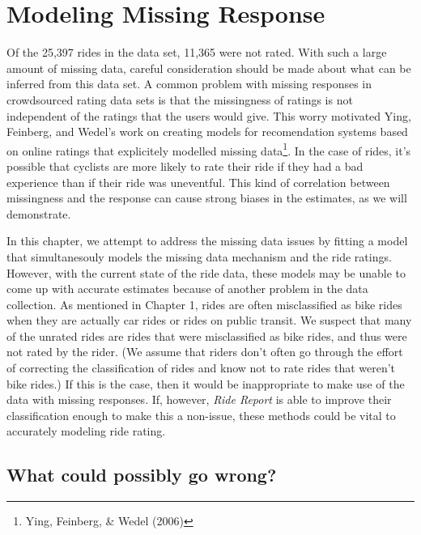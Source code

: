 \documentclass[12pt,twoside]{reedthesis}
\begin{document}
  
  \chapter{Modeling Missing Response}\label{missing-data}
  
  Of the 25,397 rides in the data set, 11,365 were not rated. With such a
  large amount of missing data, careful consideration should be made about
  what can be inferred from this data set. A common problem with missing
  responses in crowdsourced rating data sets is that the missingness of
  ratings is not independent of the ratings that the users would give.
  This worry motivated Ying, Feinberg, and Wedel's work on creating models
  for recomendation systems based on online ratings that explicitely
  modelled missing data\footnote{Ying, Feinberg, \& Wedel (2006)}. In the
  case of rides, it's possible that cyclists are more likely to rate their
  ride if they had a bad experience than if their ride was uneventful.
  This kind of correlation between missingness and the response can cause
  strong biases in the estimates, as we will demonstrate.
  
  In this chapter, we attempt to address the missing data issues by
  fitting a model that simultanesouly models the missing data mechanism
  and the ride ratings. However, with the current state of the ride data,
  these models may be unable to come up with accurate estimates because of
  another problem in the data collection. As mentioned in Chapter 1, rides
  are often misclassified as bike rides when they are actually car rides
  or rides on public transit. We suspect that many of the unrated rides
  are rides that were misclassified as bike rides, and thus were not rated
  by the rider. (We assume that riders don't often go through the effort
  of correcting the classification of rides and know not to rate rides
  that weren't bike rides.) If this is the case, then it would be
  inappropriate to make use of the data with missing responses. If,
  however, \emph{Ride Report} is able to improve their classification
  enough to make this a non-issue, these methods could be vital to
  accurately modeling ride rating.
  
  \section{What could possibly go
  wrong?}\label{what-could-possibly-go-wrong}
  
\end{document}
